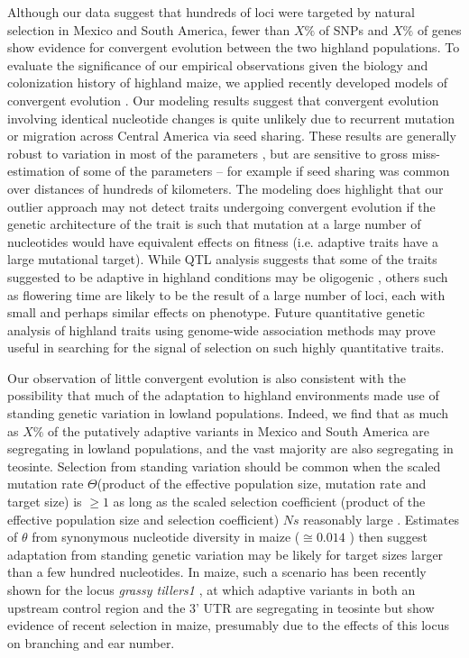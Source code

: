 Although our data suggest that hundreds of loci were targeted by natural selection in Mexico and South America, fewer than $X\%$ of SNPs and $X\%$ of genes show evidence for convergent evolution between the two highland populations.
To evaluate the significance of our empirical observations given the biology and colonization history of highland maize, we applied recently developed models of convergent evolution \citep{ralph2014convergent}.
Our modeling results suggest that convergent evolution involving identical nucleotide changes is quite unlikely due to recurrent mutation or migration across Central America via seed sharing.   
These results are generally robust to variation in most of the parameters , but are sensitive to gross miss-estimation of some of the parameters -- for example if seed sharing was common over distances of hundreds of kilometers.  
The modeling does highlight that our outlier approach may not detect traits undergoing convergent evolution if the genetic architecture of the trait is such that mutation at a large number of nucleotides would have equivalent effects on fitness (i.e. adaptive traits have a large mutational target). 
While QTL analysis suggests that some of the traits suggested to be adaptive in highland conditions may be oligogenic \citep{Lauter_2004_15342532}, others such as flowering time \citep{buckler2009genetic} are likely to be the result of a large number of loci, each with small and perhaps similar effects on phenotype.  
Future quantitative genetic analysis of highland traits using genome-wide association methods may prove useful in searching for the signal of selection on such highly quantitative traits. 

Our observation of little convergent evolution is also consistent with the possibility that much of the adaptation to highland environments made use of standing genetic variation in lowland populations. 
Indeed, we find that as much as $X\%$ of the putatively adaptive variants in Mexico and South America are segregating in lowland populations, and the vast majority are also segregating in teosinte.  
Selection from standing variation should be common when the scaled mutation rate $\Theta$(product of the effective population size, mutation rate and target size) is $\geq1$ as long as the scaled selection coefficient (product of the effective population size and selection coefficient) $Ns$ reasonably large \cite[]{Hermisson_2005_15716498}.
Estimates of $\theta$ from synonymous nucleotide diversity in maize ($\cong0.014$ \cite[\emph{e.g.,} ][]{Tenaillon_2004_15014173,Wright_2005_15919994,Ross-Ibarra_2009_19153259}) then suggest adaptation from standing genetic variation may be likely for target sizes larger than a few hundred nucleotides.
In maize, such a scenario has been recently shown for the locus \emph{grassy tillers1} \cite[]{Wills_2013_23825971}, at which adaptive variants in both an upstream control region and the 3' UTR are segregating in teosinte but show evidence of recent selection in maize, presumably due to the effects of this locus on branching and ear number.

